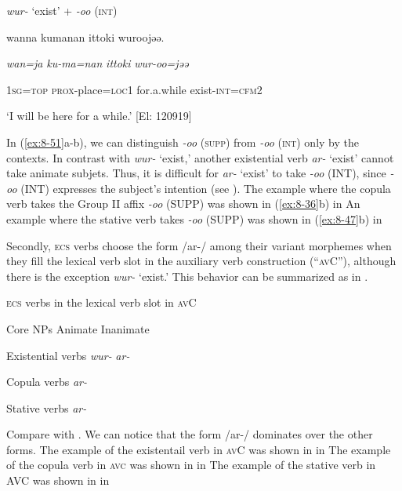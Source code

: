 \ex  \textit{wur-} ‘exist’ + \textit{{}-oo} (\textsc{int})

    {\TM}
\glll  wanna  kumanan  {\textbar}ittoki{\textbar}  wuroojəə.

      \textit{wan=ja}  \textit{ku-ma=nan}  \textit{ittoki}  \textit{wur-oo=jəə}

      1\textsc{sg}=\textsc{top}  \textsc{prox}-place=\textsc{loc}1  for.a.while  exist-\textsc{int}=\textsc{cfm}2

\glt ‘I will be here for a while.’ [El: 120919]

In (\ref{ex:8-51}a-b), we can distinguish \textit{{}-oo} (\textsc{supp}) from \textit{{}-oo} (\textsc{int}) only by the contexts. In contrast with \textit{wur-} ‘exist,’ another existential verb \textit{ar-} ‘exist’ cannot take animate subjets. Thus, it is difficult for \textit{ar{}-} ‘exist’ to take \textit{{}-oo} (INT), since \textit{{}-oo} (INT) expresses the subject’s intention (see ). The example where the copula verb takes the Group II affix \textit{{}-oo} (SUPP) was shown in (\ref{ex:8-36}b) in  An example where the stative verb takes \textit{{}-oo} (SUPP) was shown in (\ref{ex:8-47}b) in 

  Secondly, \textsc{ecs} verbs choose the form /ar-/ among their variant morphemes when they fill the lexical verb slot in the auxiliary verb construction (“\textsc{av}C”), although there is the exception \textit{wur-} ‘exist.’ This behavior can be summarized as in .

\begin{table}
\caption{\label{tab:key:76}\textsc{ecs} verbs in the lexical verb slot in \textsc{av}C}

Core NPs  Animate  Inanimate

Existential verbs  \textit{wur-}  \textit{ar-}

Copula verbs  \textit{ar-}

Stative verbs  \textit{ar-}
\end{table}

Compare  with . We can notice that the form /ar-/ dominates over the other forms. The example of the existentail verb in \textsc{av}C was shown in  in  The example of the copula verb in \textsc{avc} was shown in  in  The example of the stative verb in AVC was shown in  in 

